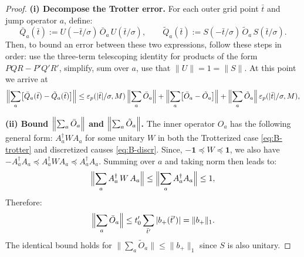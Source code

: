 \begin{proof}
    \hfill\break
    \noindent\textbf{(i) Decompose the Trotter error.}
    For each outer grid point $\bar{t}$ and jump operator $a$, define:
    $$
    \bar{Q}_a(\bar{t}) := U(-\bar{t}/\sigma)\, \bar{O}_a\, U(\bar{t}/\sigma), \qquad
    \tilde{Q}_a(\bar{t}) := S(-\bar{t}/\sigma)\, \tilde{O}_a\, S(\bar{t}/\sigma).
    $$
    Then, to bound an error between these two expressions, follow these steps in order: use the three-term telescoping identity for products of the form $PQR - P'Q'R'$, simplify, sum over $a$, use that $\|U\| = 1 = \|S\|$. At this point we arrive at
    $$
    \Bigl\|\sum_a \bigl[\bar{Q}_a(\bar{t}) - \tilde{Q}_a(\bar{t})\bigr]\Bigr\|
    \leq
    \varepsilon_p(|\bar{t}|/\sigma, M)\, \Bigl\|\sum_a \bar{O}_a\Bigr\|
    + \Bigl\|\sum_a \bigl[\bar{O}_a - \tilde{O}_a\bigr]\Bigr\|
    + \Bigl\|\sum_a \tilde{O}_a\Bigr\|\, \varepsilon_p(|\bar{t}|/\sigma, M),
    $$

    \noindent\textbf{(ii) Bound $\Bigl\|\sum_a \bar{O}_a\Bigr\|$ and $\Bigl\|\sum_a \tilde{O}_a\Bigr\|$.} The inner operator $O_a$ has the following general form: $A_a^\dagger W A_a$ for some unitary $W$ in both the Trotterized case \eqref{eq:B-trotter} and discretized causes \eqref{eq:B-discr}. Since, $-\mathbf{1} \preceq W \preceq \mathbf{1}$, we also have $-A_a^\dagger A_a \preceq A^\dagger_a W A_a \preceq A_a^\dagger A_a$. Summing over $a$ and taking norm then leads to:
    $$
    \Bigl\|\sum_a A_a^\dagger\, W\, A_a\Bigr\| \leq \Bigl\|\sum_a A_a^\dagger A_a\Bigr\| \leq 1,
    $$
    Therefore:
    $$
    \Bigl\|\sum_a \bar{O}_a\Bigr\| \leq t_0' \sum_{\bar{t}'} |b_+(\bar{t}')| = \|b_+\|_1.
    $$
    The identical bound holds for $\bigl\|\sum_a \tilde{O}_a\bigr\| \leq \|b_+\|_1$ since $S$ is also unitary.


\end{proof}
